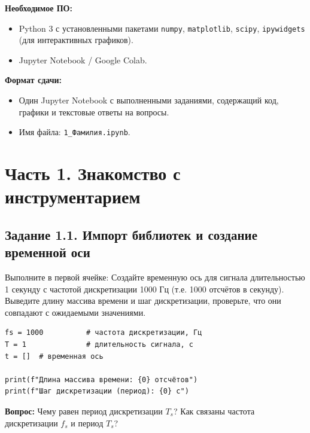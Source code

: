 \documentclass[12pt,a4paper,openany]{book}
\providecommand{\tightlist}{\setlength{\itemsep}{0pt}\setlength{\parskip}{0pt}}
\begin{document}
\textbf{Необходимое ПО:}

\begin{itemize}
\tightlist
\item
  Python 3 с установленными пакетами \texttt{numpy}, \texttt{matplotlib}, \texttt{scipy}, \texttt{ipywidgets} (для интерактивных графиков).\\
\item
  Jupyter Notebook / Google Colab.
\end{itemize}

\textbf{Формат сдачи:}

\begin{itemize}
\tightlist
\item
  Один Jupyter Notebook с выполненными заданиями, содержащий код, графики и текстовые ответы на вопросы.\\
\item
  Имя файла: \texttt{1\_\allowbreak{}Фамилия.\allowbreak{}ipynb}.
\end{itemize}

\section*{Часть 1. Знакомство с инструментарием}

\subsection*{Задание 1.1. Импорт библиотек и создание временной оси}

Выполните в первой ячейке:
Создайте временную ось для сигнала длительностью 1 секунду с частотой дискретизации 1000 Гц (т.е. 1000 отсчётов в секунду). Выведите длину массива времени и шаг дискретизации, проверьте, что они совпадают с ожидаемыми значениями.

\begin{Verbatim}[fontsize=\small, breaklines, breakanywhere, frame=single, framesep=2mm]
fs = 1000          # частота дискретизации, Гц
T = 1              # длительность сигнала, с
t = []  # временная ось

print(f"Длина массива времени: {0} отсчётов")
print(f"Шаг дискретизации (период): {0} с")
\end{Verbatim}

\textbf{Вопрос:} Чему равен период дискретизации \(T_s\)? Как связаны частота дискретизации \(f_s\) и период \(T_s\)?
\end{document}
